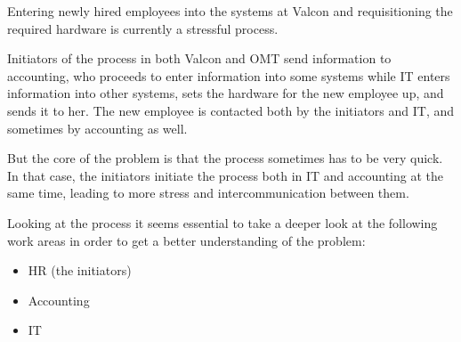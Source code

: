 Entering newly hired employees into the systems at Valcon and requisitioning the required hardware is currently a stressful process.

Initiators of the process in both Valcon and OMT send information to accounting, who proceeds to enter information into some systems while IT enters information into other systems, sets the hardware for the new employee up, and sends it to her.
The new employee is contacted both by the initiators and IT, and sometimes by accounting as well.

But the core of the problem is that the process sometimes has to be very quick.
In that case, the initiators initiate the process both in IT and accounting at the same time, leading to more stress and intercommunication between them.

Looking at the process it seems essential to take a deeper look at the following work areas in order to get a better understanding of the problem:
\begin{itemize}
\item HR (the initiators)
\item Accounting
\item IT
\end{itemize}